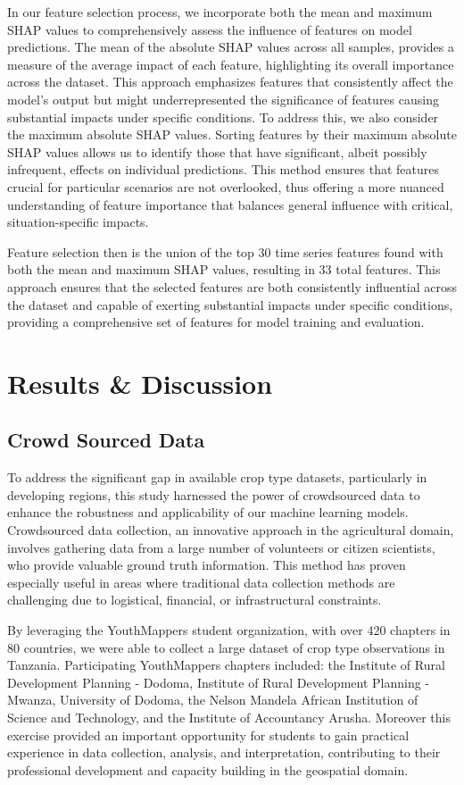 \documentclass[journal]{IEEEtran}
\begin{document}
In our feature selection process, we incorporate both the mean and maximum SHAP values to comprehensively assess the influence of features on model predictions. The mean of the absolute SHAP values across all samples, provides a measure of the average impact of each feature, highlighting its overall importance across the dataset. This approach emphasizes features that consistently affect the model’s output but might underrepresented the significance of features causing substantial impacts under specific conditions. To address this, we also consider the maximum absolute SHAP values. Sorting features by their maximum absolute SHAP values allows us to identify those that have significant, albeit possibly infrequent, effects on individual predictions. This method ensures that features crucial for particular scenarios are not overlooked, thus offering a more nuanced understanding of feature importance that balances general influence with critical, situation-specific impacts.

Feature selection then is the union of the top 30 time series features found with both the mean and maximum SHAP values, resulting in 33 total features. This approach ensures that the selected features are both consistently influential across the dataset and capable of exerting substantial impacts under specific conditions, providing a comprehensive set of features for model training and evaluation.

\section{Results \& Discussion}

\subsection{Crowd Sourced Data}

To address the significant gap in available crop type datasets, particularly in developing regions, this study harnessed the power of crowdsourced data to enhance the robustness and applicability of our machine learning models. Crowdsourced data collection, an innovative approach in the agricultural domain, involves gathering data from a large number of volunteers or citizen scientists, who provide valuable ground truth information. This method has proven especially useful in areas where traditional data collection methods are challenging due to logistical, financial, or infrastructural constraints.

By leveraging  the YouthMappers student organization, with over 420 chapters in 80 countries, we were able to collect a large dataset of crop type observations in Tanzania. Participating YouthMappers chapters included: the Institute of Rural Development Planning - Dodoma, Institute of Rural Development Planning - Mwanza, University of Dodoma, the Nelson Mandela African Institution of Science and Technology, and the Institute of Accountancy Arusha. Moreover this exercise provided an important opportunity for students to gain practical experience in data collection, analysis, and interpretation, contributing to their professional development and capacity building in the geospatial domain.
\end{document}
